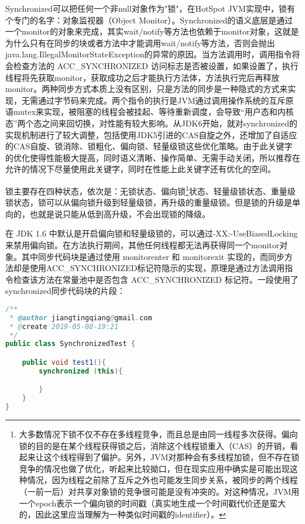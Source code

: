\documentclass[../../../interview-questions.tex]{subfiles}
\begin{document}
Synchronized可以把任何一个非null对象作为"锁"，在HotSpot JVM实现中，锁有个专门的名字：对象监视器（Object Monitor）。Synchronized的语义底层是通过一个monitor的对象来完成，其实wait/notify等方法也依赖于monitor对象，这就是为什么只有在同步的块或者方法中才能调用wait/notify等方法，否则会抛出java.lang.IllegalMonitorStateException的异常的原因。当方法调用时，调用指令将会检查方法的 ACC\_SYNCHRONIZED 访问标志是否被设置，如果设置了，执行线程将先获取monitor，获取成功之后才能执行方法体，方法执行完后再释放monitor。两种同步方式本质上没有区别，只是方法的同步是一种隐式的方式来实现，无需通过字节码来完成。两个指令的执行是JVM通过调用操作系统的互斥原语mutex来实现，被阻塞的线程会被挂起、等待重新调度，会导致“用户态和内核态”两个态之间来回切换，对性能有较大影响。从JDK6开始，就对synchronized的实现机制进行了较大调整，包括使用JDK5引进的CAS自旋之外，还增加了自适应的CAS自旋、锁消除、锁粗化、偏向锁、轻量级锁这些优化策略。由于此关键字的优化使得性能极大提高，同时语义清晰、操作简单、无需手动关闭，所以推荐在允许的情况下尽量使用此关键字，同时在性能上此关键字还有优化的空间。

锁主要存在四种状态，依次是：无锁状态、偏向锁\footnote{大多数情况下锁不仅不存在多线程竞争，而且总是由同一线程多次获得。偏向锁的目的是在某个线程获得锁之后，消除这个线程锁重入（CAS）的开销，看起来让这个线程得到了偏护。另外，JVM对那种会有多线程加锁，但不存在锁竞争的情况也做了优化，听起来比较拗口，但在现实应用中确实是可能出现这种情况，因为线程之前除了互斥之外也可能发生同步关系，被同步的两个线程（一前一后）对共享对象锁的竞争很可能是没有冲突的。对这种情况，JVM用一个epoch表示一个偏向锁的时间戳（真实地生成一个时间戳代价还是蛮大的，因此这里应当理解为一种类似时间戳的identifier）。}状态、轻量级锁状态、重量级锁状态，锁可以从偏向锁升级到轻量级锁，再升级的重量级锁。但是锁的升级是单向的，也就是说只能从低到高升级，不会出现锁的降级。

在 JDK 1.6 中默认是开启偏向锁和轻量级锁的，可以通过-XX:-UseBiasedLocking来禁用偏向锁。在方法执行期间，其他任何线程都无法再获得同一个monitor对象。其中同步代码块是通过使用 monitorenter 和 monitorexit 实现的，而同步方法却是使用ACC\_SYNCHRONIZED标记符隐示的实现，原理是通过方法调用指令检查该方法在常量池中是否包含 ACC\_SYNCHRONIZED 标记符。一段使用了synchronized同步代码块的片段：

\begin{lstlisting}[language=Java]
/**
 * @author jiangtingqiang@gmail.com
 * @create 2019-05-08-19:21
 */
public class SynchronizedTest {

    public void test1(){
        synchronized (this){

        }
    }
}
\end{lstlisting}
\end{document}
